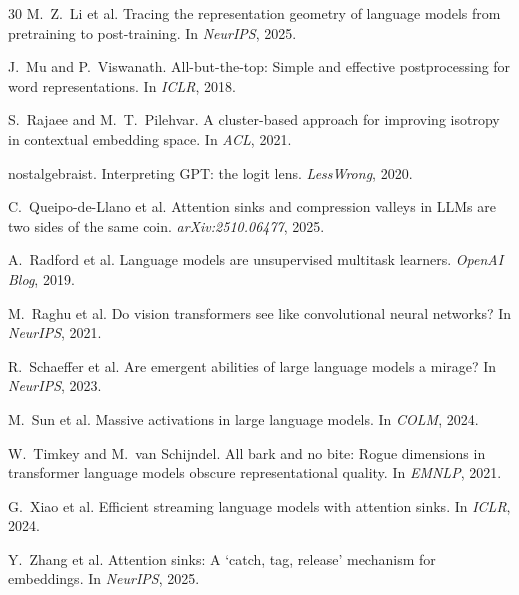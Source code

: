 \documentclass[11pt]{article}
\begin{document}
\begin{thebibliography}{30}
M.~Z.~Li et al. Tracing the representation geometry of language models from pretraining to post-training. In \emph{NeurIPS}, 2025.

J.~Mu and P.~Viswanath. All-but-the-top: Simple and effective postprocessing for word representations. In \emph{ICLR}, 2018.

S.~Rajaee and M.~T.~Pilehvar. A cluster-based approach for improving isotropy in contextual embedding space. In \emph{ACL}, 2021.

nostalgebraist. Interpreting GPT: the logit lens. \emph{LessWrong}, 2020.

C.~Queipo-de-Llano et al. Attention sinks and compression valleys in LLMs are two sides of the same coin. \emph{arXiv:2510.06477}, 2025.

A.~Radford et al. Language models are unsupervised multitask learners. \emph{OpenAI Blog}, 2019.

M.~Raghu et al. Do vision transformers see like convolutional neural networks? In \emph{NeurIPS}, 2021.

R.~Schaeffer et al. Are emergent abilities of large language models a mirage? In \emph{NeurIPS}, 2023.

M.~Sun et al. Massive activations in large language models. In \emph{COLM}, 2024.

W.~Timkey and M.~van Schijndel. All bark and no bite: Rogue dimensions in transformer language models obscure representational quality. In \emph{EMNLP}, 2021.

G.~Xiao et al. Efficient streaming language models with attention sinks. In \emph{ICLR}, 2024.

Y.~Zhang et al. Attention sinks: A `catch, tag, release' mechanism for embeddings. In \emph{NeurIPS}, 2025.

\end{thebibliography}

\newpage
\appendix
\end{document}

